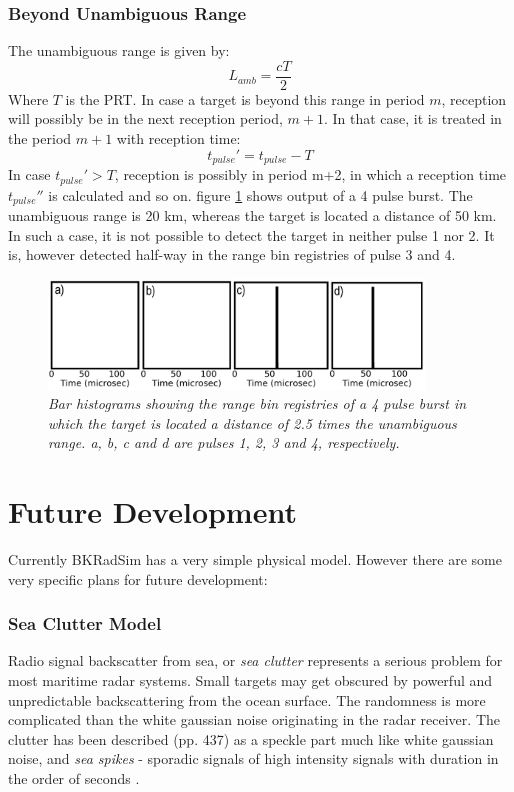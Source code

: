\documentclass[letterpaper]{book}
\begin{document}
\subsection{Beyond Unambiguous Range}
The unambiguous range is given by:
\begin{equation}
L_{amb}=\frac{cT}{2}
\end{equation}
Where \(T\) is the PRT. In case a target is beyond this range in period \(m\), reception will possibly be in the next reception period, \(m+1\). In that case, it is treated in the period \(m+1\) with reception time:
\begin{equation}
t_{pulse}'=t_{pulse}-T
\end{equation}
In case \(t_{pulse}' > T\), reception is possibly in period m+2, in which a reception time \(t_{pulse}''\) is calculated and so on. figure \ref{fig:ambiguous} shows output of a 4 pulse burst. The unambiguous range is 20 km, whereas the target is located a distance of 50 km. In such a case, it is not possible to detect the target in neither pulse 1 nor 2. It is, however detected half-way in the range bin registries of pulse 3 and 4. 
\begin{figure}
  \includegraphics[width=10cm]{ambiguous_montage.png}
  \caption{\textit{Bar histograms showing the range bin registries of a 4 pulse burst in which the target is located a distance of 2.5 times the unambiguous range. a, b, c and d are pulses 1, 2, 3 and 4, respectively.}}
  \label{fig:ambiguous}
\end{figure}


\chapter{Future Development}

Currently BKRadSim has a very simple physical model. However there are some very specific plans for future development: 
\subsection{Sea Clutter Model}
Radio signal backscatter from sea, or \textit{sea clutter} represents a serious problem for most maritime radar systems. Small targets may get obscured by powerful and unpredictable backscattering from the ocean surface. The randomness is more complicated than the white gaussian noise originating in the radar receiver. The clutter has been described \cite{ref:skolnik} (pp. 437) as a speckle part much like white gaussian noise, and \textit{sea spikes} - sporadic signals of high intensity signals with duration in the order of seconds \cite{ref:hansen_et_al}. 
\end{document}
